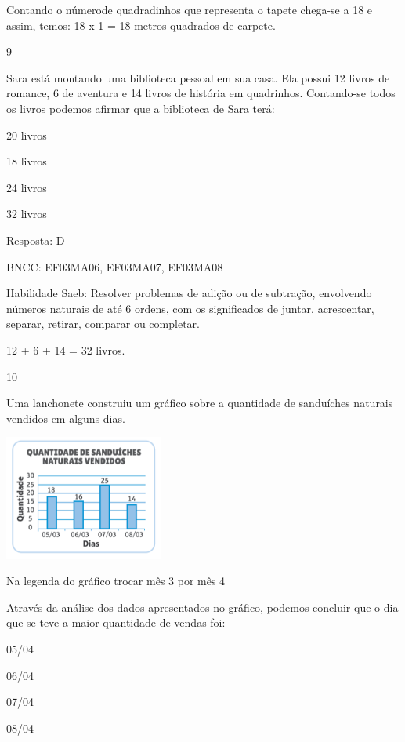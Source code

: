 \begin{escolha}
{\begin{escolha}
{Contando o númerode quadradinhos que representa o tapete chega-se a 18 e
assim, temos: 18 x 1 = 18 metros quadrados de carpete.

\num{9}

Sara está montando uma biblioteca pessoal em sua casa. Ela possui 12
livros de romance, 6 de aventura e 14 livros de história em quadrinhos.
Contando-se todos os livros podemos afirmar que a biblioteca de Sara
terá:

\begin{escolha}
\item
  20 livros
\item
  18 livros
\item
  24 livros
\item
  32 livros
\end{escolha}

Resposta: D

BNCC: EF03MA06, EF03MA07, EF03MA08

Habilidade Saeb: Resolver problemas de adição ou de subtração,
envolvendo números naturais de até 6 ordens, com os significados de
juntar, acrescentar, separar, retirar, comparar ou completar.

12 + 6 + 14 = 32 livros.

\num{10}

Uma lanchonete construiu um gráfico sobre a quantidade de sanduíches
naturais vendidos em alguns dias.

\includegraphics[width=2.05128in,height=1.61850in]{media/image124.png}

Na legenda do gráfico trocar mês 3 por mês 4

Através da análise dos dados apresentados no gráfico, podemos concluir
que o dia que se teve a maior quantidade de vendas foi:

\begin{escolha}

\item
  05/04
\item
  06/04
\item
  07/04
\item
  08/04
\end{escolha}

}
\end{escolha}}
\end{escolha}
